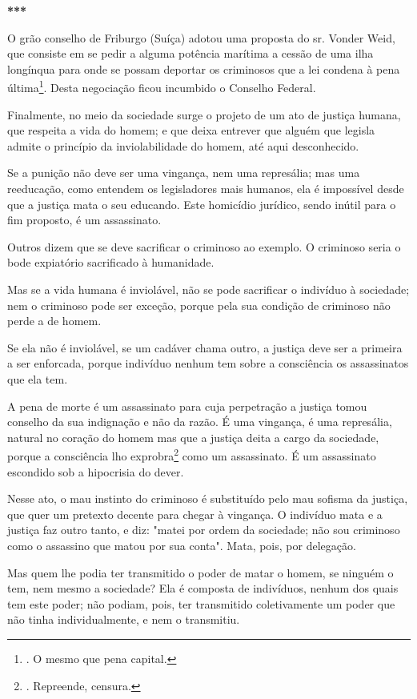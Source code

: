 \textbf{***}

O grão conselho de Friburgo (Suíça) adotou uma proposta do sr. Vonder
Weid, que consiste em se pedir a alguma potência marítima a cessão de
uma ilha longínqua para onde se possam deportar os criminosos que a lei
condena à pena última\footnote{. O mesmo que pena capital.}. Desta
negociação ficou incumbido o Conselho Federal.

Finalmente, no meio da sociedade surge o projeto de um ato de justiça
humana, que respeita a vida do homem; e que deixa entrever que alguém
que legisla admite o princípio da inviolabilidade do homem, até aqui
desconhecido.

Se a punição não deve ser uma vingança, nem uma represália; mas uma
reeducação, como entendem os legisladores mais humanos, ela é impossível
desde que a justiça mata o seu educando. Este homicídio jurídico, sendo
inútil para o fim proposto, é um assassinato.

Outros dizem que se deve sacrificar o criminoso ao exemplo. O criminoso
seria o bode expiatório sacrificado à humanidade.

Mas se a vida humana é inviolável, não se pode sacrificar o indivíduo à
sociedade; nem o criminoso pode ser exceção, porque pela sua condição de
criminoso não perde a de homem.

Se ela não é inviolável, se um cadáver chama outro, a justiça deve ser a
primeira a ser enforcada, porque indivíduo nenhum tem sobre a
consciência os assassinatos que ela tem.

A pena de morte é um assassinato para cuja perpetração a justiça tomou
conselho da sua indignação e não da razão. É uma vingança, é uma
represália, natural no coração do homem mas que a justiça deita a cargo
da sociedade, porque a consciência lho exprobra\footnote{. Repreende,
  censura.} como um assassinato. É um assassinato escondido sob a
hipocrisia do dever.

Nesse ato, o mau instinto do criminoso é substituído pelo mau sofisma da
justiça, que quer um pretexto decente para chegar à vingança. O
indivíduo mata e a justiça faz outro tanto, e diz: "matei por ordem da
sociedade; não sou criminoso como o assassino que matou por sua conta".
Mata, pois, por delegação.

Mas quem lhe podia ter transmitido o poder de matar o homem, se ninguém
o tem, nem mesmo a sociedade? Ela é composta de indivíduos, nenhum dos
quais tem este poder; não podiam, pois, ter transmitido coletivamente um
poder que não tinha individualmente, e nem o transmitiu.

